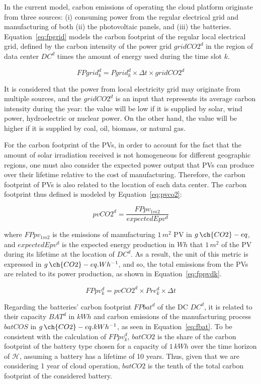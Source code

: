 In the current model, carbon emissions of operating the cloud platform originate from three sources: (i) consuming power from the regular electrical grid and manufacturing of both (ii) the photovoltaic panels, and (iii) the batteries. Equation~\eqref{eq:fpgrid} models the carbon footprint of the regular local electrical grid, defined by the carbon intensity of the power grid $gridCO2^d$ in the region of data center $DC^d$  times the amount of energy used during the time slot $k$.

\begin{equation} \label{eq:fpgrid}
FPgrid_k^d = Pgrid_k^d\times \Delta t \times gridCO2^d
\end{equation}

It is considered that the power from local electricity grid may originate from multiple sources, and the $gridCO2^d$ is an input that represents its average carbon intensity during the year: the value will be low if it is supplied by solar, wind power, hydroelectric or nuclear power. On the other hand, the value will be higher if it is supplied by coal, oil, biomass, or natural gas.

For the carbon footprint of the PVs, in order to account for the fact that the amount of solar irradiation received is not homogeneous for different geographic regions, one must also consider the expected power output that PVs can produce over their lifetime relative to the cost of manufacturing. Therefore, the carbon footprint of PVs is also related to the location of each data center. The carbon footprint thus defined is modeled by Equation~\eqref{eq:pvco2}:

\begin{equation} \label{eq:pvco2}
   pvCO2^d =  \frac{FPpv_{1m2}}{expectedEpv^d} 
\end{equation}

where $FPpv_{1m2}$ is the emissions of manufacturing $1\,m^2$ PV in $g\,\ch{CO2}-eq$, and $expectedEpv^d$ is the expected energy production in $Wh$ that $1\,m^2$ of the PV during its lifetime at the location of $DC^d$. As a result, the unit of this metric is expressed in $g\,\ch{CO2}-eq.Wh^{-1}$, and so, the total emissions from the PVs are related to its power production, as shown in Equation~\eqref{eq:fppvdk}. 

\begin{equation} \label{eq:fppvdk}
   FPpv^d_k =  pvCO2^d \times Pre_k^d \times \Delta t
\end{equation}

Regarding the batteries' carbon footprint $FPbat^d$ of the DC $DC^d$, it is related to their capacity $BAT^d$ in $kWh$ and carbon emissions of the manufacturing process $batCOS$ in $g\,\ch{CO2}-eq.kWh^{-1}$, as seen in Equation~\eqref{eq:fbat}. To be consistent with the calculation of $FPpv^d_k$, $batCO2$ is the share of the carbon footprint of the battery type chosen for a capacity of $1\,kWh$ over the time horizon of $\mathcal{H}$, assuming a battery has a lifetime of 10 years.  Thus, given that we are considering 1 year of cloud operation, $batCO2$ is the tenth of the total carbon footprint of the considered battery.

